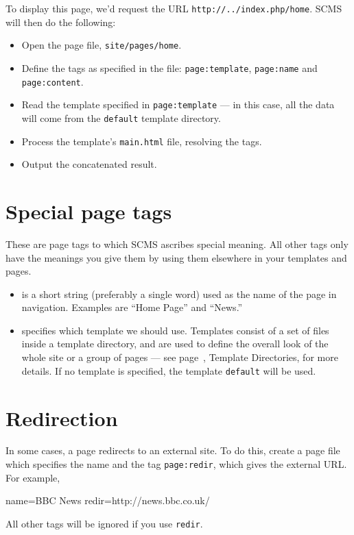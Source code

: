To display this page, we'd request the URL \texttt{http://../index.php/home}.
SCMS will then do the following:
\begin{itemize}
 \item Open the page file, \texttt{site/pages/home}.
 \item Define the tags as specified in the file: \texttt{page:template},
  \texttt{page:name} and \texttt{page:content}.
 \item Read the template specified in \texttt{page:template} --- in this case, all the data will come from the \texttt{default} template directory.
 \item Process the template's \texttt{main.html} file, resolving the tags.
 \item Output the concatenated result.
\end{itemize}

\section{Special page tags}
These are page tags to which SCMS ascribes special meaning. All other tags only have the meanings you give them by using
them elsewhere in your templates and pages.
\begin{itemize}
\item {} is a short string (preferably a single word) used as the name of the page in navigation. Examples
are ``Home Page'' and ``News.''
\item {} specifies which template we should use. Templates consist of a set of files inside a template directory, and are used to define the overall look of the whole site or a group of pages --- see page~\pageref{templatedirs}, Template Directories, for more details. If no template is specified, the template \texttt{default} will be used.
\end{itemize}

\section{Redirection}
In some cases, a page redirects to an external site. To do this, create a page file which specifies the
name and the tag \texttt{page:redir}, which gives the external URL. For example,
\begin{MyVerbatim}
 name=BBC News
 redir=http://news.bbc.co.uk/
\end{MyVerbatim}
All other tags will be ignored if you use \texttt{redir}.

